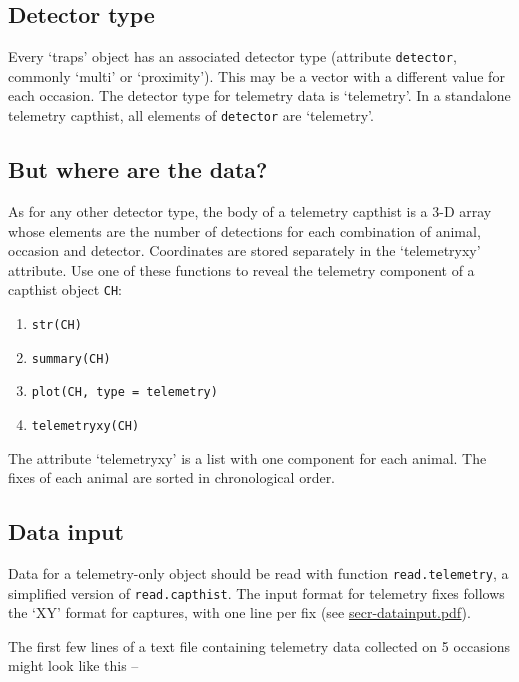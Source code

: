 \documentclass[
]{book}
\providecommand{\tightlist}{%
  \setlength{\itemsep}{0pt}\setlength{\parskip}{0pt}}
\begin{document}
\subsection{Detector type}\label{detector-type}

Every `traps' object has an associated detector type (attribute \texttt{detector}, commonly `multi' or `proximity'). This may be a vector with a different value for each occasion. The detector type for telemetry data is `telemetry'. In a standalone telemetry capthist, all elements of \texttt{detector} are `telemetry'.

\subsection{But where are the data?}\label{but-where-are-the-data}

As for any other detector type, the body of a telemetry capthist is a 3-D array whose elements are the number of detections for each combination of animal, occasion and detector. Coordinates are stored separately in the `telemetryxy' attribute. Use one of these functions to reveal the telemetry component of a capthist object \texttt{CH}:

\begin{enumerate}
\def\labelenumi{\arabic{enumi}.}
\tightlist
\item
  \texttt{str(CH)}
\item
  \texttt{summary(CH)}
\item
  \texttt{plot(CH,\ type\ =\ \textquotesingle{}telemetry\textquotesingle{})}
\item
  \texttt{telemetryxy(CH)}
\end{enumerate}

The attribute `telemetryxy' is a list with one component for each animal. The fixes of each animal are sorted in chronological order.

\subsection{Data input}\label{data-input-1}

Data for a telemetry-only object should be read with function \texttt{read.telemetry}, a simplified version of \texttt{read.capthist}. The input format for telemetry fixes follows the `XY' format for captures, with one line per fix (see \href{https://www.otago.ac.nz/density/pdfs/secr-datainput.pdf}{secr-datainput.pdf}).

The first few lines of a text file containing telemetry data collected on 5 occasions might look like this --
\end{document}
